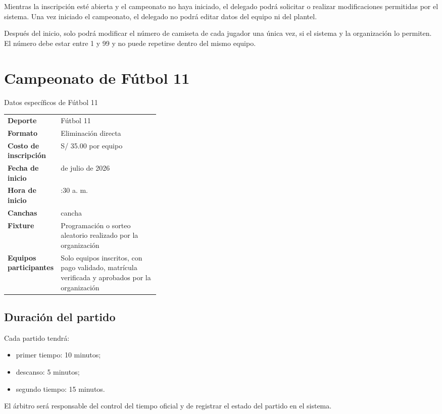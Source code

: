 \documentclass[12pt,a4paper]{article}
\newcommand{\fechaInicioFutbol}{9 de julio de 2026}
\newcommand{\horaInicioFutbol}{8:30 a. m.}
\newcommand{\datoTabla}[2]{%
	\textbf{\textcolor{imegreenDark}{#1}} & #2\\[0.35em]
}
\begin{document}
	Mientras la inscripción esté abierta y el campeonato no haya iniciado, el delegado podrá solicitar o realizar modificaciones permitidas por el sistema. Una vez iniciado el campeonato, el delegado no podrá editar datos del equipo ni del plantel.
	
	Después del inicio, solo podrá modificar el número de camiseta de cada jugador una única vez, si el sistema y la organización lo permiten. El número debe estar entre 1 y 99 y no puede repetirse dentro del mismo equipo.
	
	\section{Campeonato de Fútbol 11}
	
	\begin{cajaResumen}{Datos específicos de Fútbol 11}
		\renewcommand{\arraystretch}{1.25}
		\begin{tabularx}{\linewidth}{
				>{\RaggedRight\arraybackslash}p{0.35\linewidth}
				>{\RaggedRight\arraybackslash}X
			}
			\datoTabla{Deporte}{Fútbol 11}
			\datoTabla{Formato}{Eliminación directa}
			\datoTabla{Costo de inscripción}{S/ 35.00 por equipo}
			\datoTabla{Fecha de inicio}{\fechaInicioFutbol}
			\datoTabla{Hora de inicio}{\horaInicioFutbol}
			\datoTabla{Canchas}{1 cancha}
			\datoTabla{Fixture}{Programación o sorteo aleatorio realizado por la organización}
			\datoTabla{Equipos participantes}{Solo equipos inscritos, con pago validado, matrícula verificada y aprobados por la organización}
		\end{tabularx}
	\end{cajaResumen}
	
	\subsection{Duración del partido}
	
	Cada partido tendrá:
	
	\begin{itemize}
		\item primer tiempo: 10 minutos;
		\item descanso: 5 minutos;
		\item segundo tiempo: 15 minutos.
	\end{itemize}
	
	El árbitro será responsable del control del tiempo oficial y de registrar el estado del partido en el sistema.
	
\end{document}
